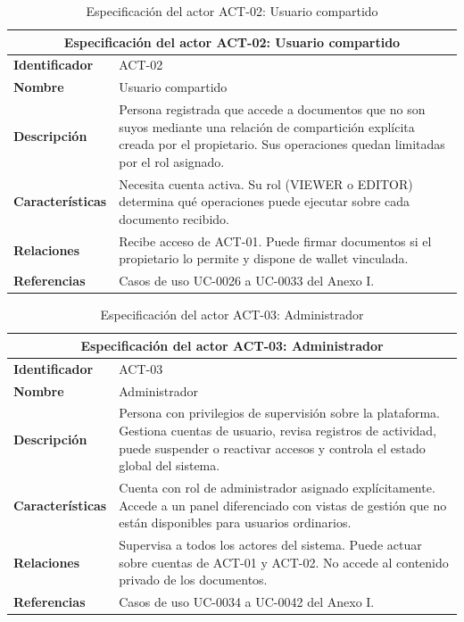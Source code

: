 \documentclass[11pt, a4paper]{article}
\begin{document}
\begin{table}[H]
    \centering
    \small
    \begin{tabular}{|p{4cm}|p{9cm}|}
    \hline
    \multicolumn{2}{|c|}{\textbf{Especificación del actor ACT-02: Usuario compartido}} \\
    \hline
    \textbf{Identificador} & ACT-02 \\
    \hline
    \textbf{Nombre} & Usuario compartido \\
    \hline
    \textbf{Descripción} & Persona registrada que accede a documentos que no son suyos mediante una relación de compartición explícita creada por el propietario. Sus operaciones quedan limitadas por el rol asignado. \\
    \hline
    \textbf{Características} & Necesita cuenta activa. Su rol (VIEWER o EDITOR) determina qué operaciones puede ejecutar sobre cada documento recibido. \\
    \hline
    \textbf{Relaciones} & Recibe acceso de ACT-01. Puede firmar documentos si el propietario lo permite y dispone de wallet vinculada. \\
    \hline
    \textbf{Referencias} & Casos de uso UC-0026 a UC-0033 del Anexo I. \\
    \hline
    \end{tabular}
    \caption{Especificación del actor ACT-02: Usuario compartido}
    \label{tab:actor-act02}
\end{table}

\begin{table}[H]
    \centering
    \small
    \begin{tabular}{|p{4cm}|p{9cm}|}
    \hline
    \multicolumn{2}{|c|}{\textbf{Especificación del actor ACT-03: Administrador}} \\
    \hline
    \textbf{Identificador} & ACT-03 \\
    \hline
    \textbf{Nombre} & Administrador \\
    \hline
    \textbf{Descripción} & Persona con privilegios de supervisión sobre la plataforma. Gestiona cuentas de usuario, revisa registros de actividad, puede suspender o reactivar accesos y controla el estado global del sistema. \\
    \hline
    \textbf{Características} & Cuenta con rol de administrador asignado explícitamente. Accede a un panel diferenciado con vistas de gestión que no están disponibles para usuarios ordinarios. \\
    \hline
    \textbf{Relaciones} & Supervisa a todos los actores del sistema. Puede actuar sobre cuentas de ACT-01 y ACT-02. No accede al contenido privado de los documentos. \\
    \hline
    \textbf{Referencias} & Casos de uso UC-0034 a UC-0042 del Anexo I. \\
    \hline
    \end{tabular}
    \caption{Especificación del actor ACT-03: Administrador}
    \label{tab:actor-act03}
\end{table}
\end{document}
